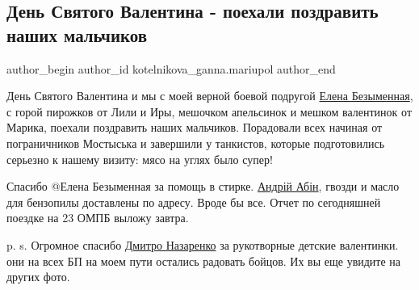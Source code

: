  
 
 
 
 

\subsection{День Святого Валентина - поехали поздравить наших мальчиков}
\label{sec:15_02_2015.fb.kotelnikova_ganna.mariupol.1.den_svyatogo_valenti}

\ifcmt
 author_begin
   author_id kotelnikova_ganna.mariupol
 author_end
\fi

День Святого Валентина и мы с моей верной боевой подругой
\href{https://www.facebook.com/OlenaZolota}{Елена Безыменная}, с горой пирожков
от Лили и Иры, мешочком апельсинок и мешком валентинок от Марика, поехали
поздравить наших мальчиков. Порадовали всех  начиная от пограничников Мостыська
и завершили у танкистов, которые подготовились серьезно к нашему визиту: мясо на
углях было супер!

Спасибо @Елена Безыменная за помощь в стирке.
\href{https://www.facebook.com/profile.php?id=100006142006641}{Андрій Абін},
гвозди и масло для бензопилы доставлены по адресу. Вроде бы все. Отчет по
сегодняшней поездке на 23 ОМПБ выложу завтра.

p. s. Огромное спасибо
\href{https://www.facebook.com/profile.php?id=100004336959082}{Дмитро
Назаренко} за рукотворные детские валентинки. они на всех БП на моем пути
остались радовать бойцов. Их вы еще увидите на других фото.

